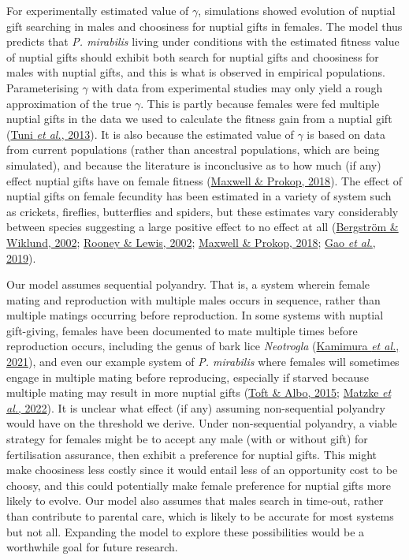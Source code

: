 \documentclass[
]{article}
\begin{document}
For experimentally estimated value of \(\gamma\), simulations showed
evolution of nuptial gift searching in males and choosiness for nuptial
gifts in females. The model thus predicts that \emph{P. mirabilis}
living under conditions with the estimated fitness value of nuptial
gifts should exhibit both search for nuptial gifts and choosiness for
males with nuptial gifts, and this is what is observed in empirical
populations. Parameterising \(\gamma\) with data from experimental
studies may only yield a rough approximation of the true \(\gamma\).
This is partly because females were fed multiple nuptial gifts in the
data we used to calculate the fitness gain from a nuptial gift
(\protect\hyperlink{ref-Tuni2013a}{Tuni \emph{et al.}, 2013}). It is
also because the estimated value of \(\gamma\) is based on data from
current populations (rather than ancestral populations, which are being
simulated), and because the literature is inconclusive as to how much
(if any) effect nuptial gifts have on female fitness
(\protect\hyperlink{ref-Maxwell2018}{Maxwell \& Prokop, 2018}). The
effect of nuptial gifts on female fecundity has been estimated in a
variety of system such as crickets, fireflies, butterflies and spiders,
but these estimates vary considerably between species suggesting a large
positive effect to no effect at all
(\protect\hyperlink{ref-Bergstrom2002}{Bergström \& Wiklund, 2002};
\protect\hyperlink{ref-Rooney2002}{Rooney \& Lewis, 2002};
\protect\hyperlink{ref-Maxwell2018}{Maxwell \& Prokop, 2018};
\protect\hyperlink{ref-Gao2019}{Gao \emph{et al.}, 2019}).

Our model assumes sequential polyandry. That is, a system wherein female
mating and reproduction with multiple males occurs in sequence, rather
than multiple matings occurring before reproduction. In some systems
with nuptial gift-giving, females have been documented to mate multiple
times before reproduction occurs, including the genus of bark lice
\emph{Neotrogla} (\protect\hyperlink{ref-Kamimura2021}{Kamimura \emph{et
al.}, 2021}), and even our example system of \emph{P. mirabilis} where
females will sometimes engage in multiple mating before reproducing,
especially if starved because multiple mating may result in more nuptial
gifts (\protect\hyperlink{ref-Toft2015}{Toft \& Albo, 2015};
\protect\hyperlink{ref-Matzke2022}{Matzke \emph{et al.}, 2022}). It is
unclear what effect (if any) assuming non-sequential polyandry would
have on the threshold we derive. Under non-sequential polyandry, a
viable strategy for females might be to accept any male (with or without
gift) for fertilisation assurance, then exhibit a preference for nuptial
gifts. This might make choosiness less costly since it would entail less
of an opportunity cost to be choosy, and this could potentially make
female preference for nuptial gifts more likely to evolve. Our model
also assumes that males search in time-out, rather than contribute to
parental care, which is likely to be accurate for most systems but not
all. Expanding the model to explore these possibilities would be a
worthwhile goal for future research.
\end{document}
